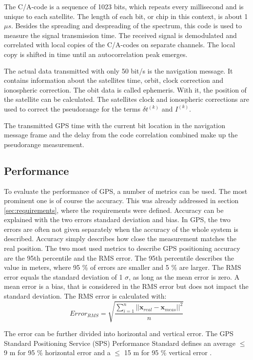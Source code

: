 The C/A-code is a sequence of 1023 bits, which repeats every millisecond and is unique to each satellite.
The length of each bit, or chip in this context, is about 1 $\mu s$.
Besides the spreading and despreading of the spectrum, this code is used to measure the signal transmission time.
The received signal is demodulated and correlated with local copies of the C/A-codes on separate channels.
The local copy is shifted in time until an autocorrelation peak emerges.

The actual data transmitted with only 50 bit/s is the navigation message.
It contains information about the satellites time, orbit, clock correction and ionospheric correction.
The obit data is called ephemeris.
With it, the position of the satellite can be calculated.
The satellites clock and ionospheric corrections are used to correct the pseudorange for the terms $\delta t^{(k)}$ and $I^{(k)}$.

The transmitted GPS time with the current bit location in the navigation message frame and the delay from the code correlation combined make up the pseudorange measurement.

\subsection{Performance}

To evaluate the performance of GPS, a number of metrics can be used.
The most prominent one is of course the accuracy.
This was already addressed in section \ref{sec:requirements}, where the requirements were defined.
Accuracy can be explained with the two errors standard deviation and bias.
In GPS, the two errors are often not given separately when the accuracy of the whole system is described.
Accuracy simply describes how close the measurement matches the real position.
The two most used metrics to describe GPS positioning accuracy are the 95th percentile and the RMS error.
The 95th percentile describes the value in meters, where 95 \% of errors are smaller and 5 \% are larger.
The RMS error equals the standard deviation of 1 $\sigma$, as long as the mean error is zero.
A mean error is a bias, that is considered in the RMS error but does not impact the standard deviation.
The RMS error is calculated with:
\begin{equation}
 Error_{RMS} = \sqrt{\frac{\sum\limits_{i=1}^n \lvert\lvert \textbf{x}_{real} - \textbf{x}_{meas} \rvert\rvert^2}{n}}
\end{equation}

The error can be further divided into horizontal and vertical error.
The GPS Standard Positioning Service (SPS) Performance Standard defines an average $\leq$ 9 m for 95 \% horizontal error and a $\leq$ 15 m for 95 \% vertical error \cite{SPS_Performance}.

